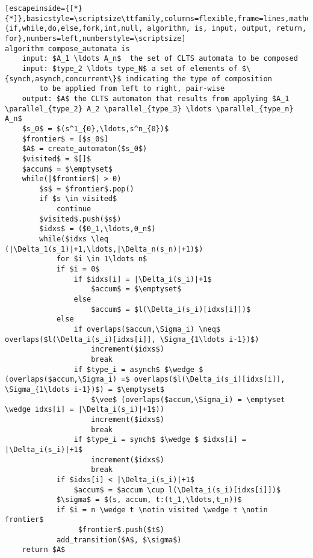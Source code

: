 \renewcommand{\ttdefault}{pcr}
\begin{lstlisting}[escapeinside={[*}{*]},basicstyle=\scriptsize\ttfamily,columns=flexible,frame=lines,mathescape=true,xleftmargin=3.0ex,keywordstyle=\textbf,morekeywords={if,while,do,else,fork,int,null, algorithm, is, input, output, return, for},numbers=left,numberstyle=\scriptsize]
algorithm compose_automata is
	input: $A_1 \ldots A_n$  the set of CLTS automata to be composed
	input: $type_2 \ldots type_N$ a set of elements of $\{synch,asynch,concurrent\}$ indicating the type of composition 
		to be applied from left to right, pair-wise
	output: $A$ the CLTS automaton that results from applying $A_1 \parallel_{type_2} A_2 \parallel_{type_3} \ldots \parallel_{type_n} A_n$
	$s_0$ = $(s^1_{0},\ldots,s^n_{0})$
	$frontier$ = [$s_0$]
	$A$ = create_automaton($s_0$)
	$visited$ = $[]$
	$accum$ = $\emptyset$
	while(|$frontier$| > 0)
		$s$ = $frontier$.pop()
		if $s \in visited$
			continue
		$visited$.push($s$)
		$idxs$ = ($0_1,\ldots,0_n$)
		while($idxs \leq (|\Delta_1(s_1)|+1,\ldots,|\Delta_n(s_n)|+1)$)
			for $i \in 1\ldots n$
			if $i = 0$
				if $idxs[i] = |\Delta_i(s_i)|+1$
					$accum$ = $\emptyset$
				else
					$accum$ = $l(\Delta_i(s_i)[idxs[i]])$
			else
				if overlaps($accum,\Sigma_i) \neq$ overlaps($l(\Delta_i(s_i)[idxs[i]], \Sigma_{1\ldots i-1})$)
					increment($idxs$)
					break
				if $type_i = asynch$ $\wedge $ (overlaps($accum,\Sigma_i) =$ overlaps($l(\Delta_i(s_i)[idxs[i]], \Sigma_{1\ldots i-1})$) = $\emptyset$
					$\vee$ (overlaps($accum,\Sigma_i) = \emptyset \wedge idxs[i] = |\Delta_i(s_i)|+1$))
					increment($idxs$)
					break					
				if $type_i = synch$ $\wedge $ $idxs[i] = |\Delta_i(s_i)|+1$
					increment($idxs$)
					break	
			if $idxs[i] < |\Delta_i(s_i)|+1$
				$accum$ = $accum \cup l(\Delta_i(s_i)[idxs[i]])$
			$\sigma$ = $(s, accum, t:(t_1,\ldots,t_n))$
			if $i = n \wedge t \notin visited \wedge t \notin frontier$ 
				 $frontier$.push($t$)
			add_transition($A$, $\sigma$)			
	return $A$

\end{lstlisting}